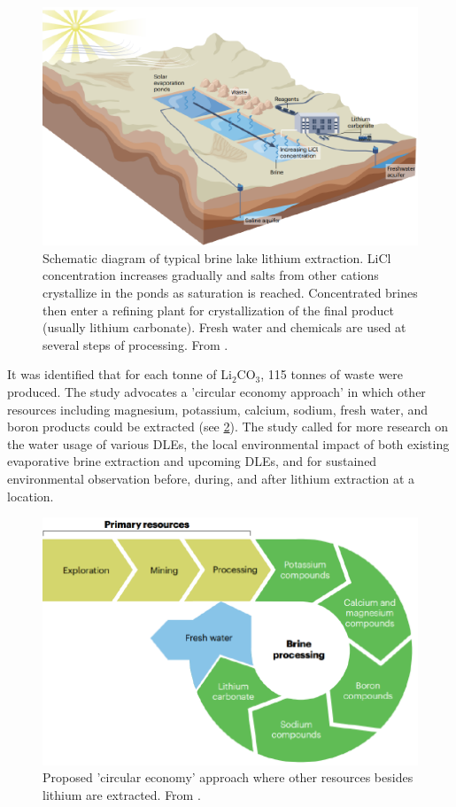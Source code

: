 \begin{figure}[h!]
    \centering
    \includegraphics[width =0.65\linewidth]{SubreportFigures/brine_lake.pdf}
    \caption{Schematic diagram of typical brine lake lithium extraction.  LiCl concentration 
increases gradually and salts from other cations crystallize in the ponds as 
saturation is reached. Concentrated brines then enter a refining plant for 
crystallization of the final product (usually lithium carbonate). Fresh water and 
chemicals are used at several steps of processing. From \cite{vera2023environmental}. }
    \label{fig:circ_economy}
\end{figure}

It was identified that for each tonne of Li$_2$CO$_3$, 115 tonnes of waste were produced. The study advocates a 'circular economy approach' in which other resources including magnesium, potassium, calcium, sodium, fresh water, and boron products could be extracted (see \ref{fig:circ_economy}). The study called for more research on the water usage of various DLEs, the local environmental impact of both existing evaporative brine extraction and upcoming DLEs, and for sustained environmental observation before, during, and after lithium extraction at a location.

\begin{figure}[h!]
    \centering
    \includegraphics[width =0.65\linewidth]{SubreportFigures/circ_economy.pdf}
    \caption{Proposed 'circular economy' approach where other resources besides lithium are extracted. From \cite{vera2023environmental}. }
    \label{fig:circ_economy}
\end{figure}

